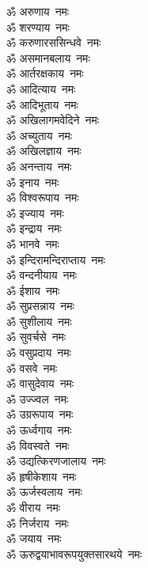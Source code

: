 \begin{multicols}{2}
    \begin{flushleft}
        ॐ अरुणाय~नमः\\
        ॐ शरण्याय~नमः\\
        ॐ करुणारससिन्धवे~नमः\\
        ॐ असमानबलाय~नमः\\
        ॐ आर्तरक्षकाय~नमः\\
        ॐ आदित्याय~नमः\\
        ॐ आदिभूताय~नमः\\
        ॐ अखिलागमवेदिने~नमः\\
        ॐ अच्युताय~नमः\\
        ॐ अखिलज्ञाय~नमः\hfill{}\\
        ॐ अनन्ताय~नमः\\
        ॐ इनाय~नमः\\
        ॐ विश्वरूपाय~नमः\\
        ॐ इज्याय~नमः\\
        ॐ इन्द्राय~नमः\\
        ॐ भानवे~नमः\\
        ॐ इन्दिरामन्दिराप्ताय~नमः\\
        ॐ वन्दनीयाय~नमः\\
        ॐ ईशाय~नमः\\
        ॐ सुप्रसन्नाय~नमः\hfill{}\\
        ॐ सुशीलाय~नमः\\
        ॐ सुवर्चसे~नमः\\
        ॐ वसुप्रदाय~नमः\\
        ॐ वसवे~नमः\\
        ॐ वासुदेवाय~नमः\\
        ॐ उज्ज्वल~नमः\\
        ॐ उग्ररूपाय~नमः\\
        ॐ ऊर्ध्वगाय~नमः\\
        ॐ विवस्वते~नमः\\
        ॐ उद्यत्किरणजालाय~नमः\hfill{}\\
        ॐ हृषीकेशाय~नमः\\
        ॐ ऊर्जस्वलाय~नमः\\
        ॐ वीराय~नमः\\
        ॐ निर्जराय~नमः\\
        ॐ जयाय~नमः\\
        ॐ ऊरुद्वयाभावरूपयुक्तसारथये~नमः\\

\end{flushleft}
\end{multicols}
